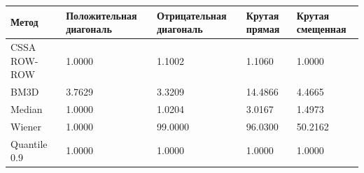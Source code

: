 \begin{tabular}{|l|l|l|l|l|}
\hline
Метод & Положительная диагональ & Отрицательная диагональ & Крутая прямая & Крутая смещенная \\
\hline
CSSA ROW-ROW & 1.0000 & 1.1002 & 1.1060 & 1.0000 \\
\hline
BM3D & 3.7629 & 3.3209 & 14.4866 & 4.4665 \\
\hline
Median & 1.0000 & 1.0204 & 3.0167 & 1.4973 \\
\hline
Wiener & 1.0000 & 99.0000 & 96.0300 & 50.2162 \\
\hline
Quantile 0.9 & 1.0000 & 1.0000 & 1.0000 & 1.0000 \\
\hline
\end{tabular}
